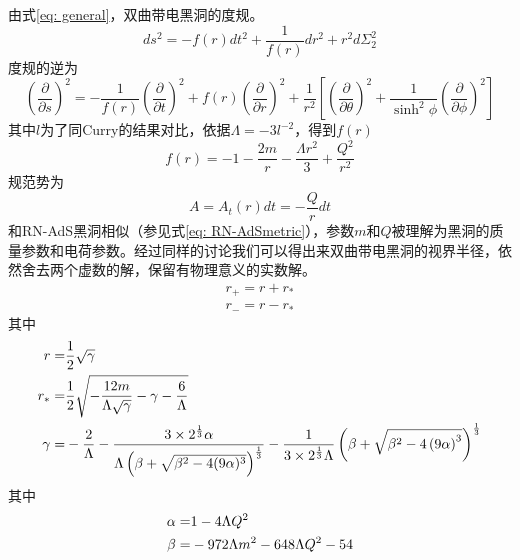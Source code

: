 由式\eqref{eq: general}，双曲带电黑洞的度规。
\begin{equation}
    ds^2=-f\left(r\right)dt^2+\frac{1}{f\left(r\right)}dr^2+r^2d\Sigma^2_2
\end{equation}
度规的逆为
\begin{equation}
    \left(\frac{\partial }{\partial s}\right)^2=-\frac{1}{f\left(r\right)}\left(\frac{\partial }{\partial t}\right)^2+f\left(r\right)\left(\frac{\partial }{\partial r}\right)^2+\frac{1}{r^2}\left[\left(\frac{\partial }{\partial \theta}\right)^2+\frac{1}{\sinh ^2 \phi}\left(\frac{\partial }{\partial \phi}\right)^2\right]
\end{equation}
其中$l$为了同Curry的结果对比，依据$\Lambda=-3l^{-2}$，得到$f\left(r\right)$
\begin{equation}
    f\left(r\right)=-1-\frac{2m}{r}-\frac{\Lambda r^2}{3}+\frac{Q^2}{r^2}
\end{equation}
规范势为
\begin{equation}
    A=A_t\left(r\right)dt=-\frac{Q}{r}dt
\end{equation}
和RN-AdS黑洞相似（参见式\eqref{eq: RN-AdSmetric}），参数$m$和$Q$被理解为黑洞的质量参数和电荷参数。经过同样的讨论我们可以得出来双曲带电黑洞的视界半径，依然舍去两个虚数的解，保留有物理意义的实数解。
\begin{align}
    r_+=r + r_* \label{eq: hyr+} \\
    r_-=r-r_* \label{eq: hyr-} 
\end{align}
其中
\begin{align*}
    r=&\frac{1}{2}\sqrt{\gamma} \\
    r_*=&\frac{1}{2}\sqrt{-\frac{12m}{\Lambda \sqrt{\gamma}}-\gamma-\frac{6}{\Lambda}} \\
    \gamma =&-\frac{2}{\Lambda}-\frac{3 \times 2^{\frac{1}{3}}\alpha}{\Lambda \left(\beta+\sqrt{\beta^2-4 (9\alpha)^3} \right)^{\frac{1}{3}}}-\frac{1}{3 \times 2^{\frac{1}{3}}\Lambda}\left(\beta +\sqrt{\beta^2-4 \left(9\alpha\right)^3}\right)^{\frac{1}{3}} \notag
\end{align*}
其中
\begin{align*}
    \alpha =& 1-4\Lambda  Q^2    \notag \\
    \beta =&-972 \Lambda  m^2-648 \Lambda Q^2-54 \notag 
\end{align*}
